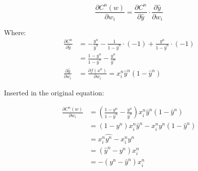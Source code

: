 
\begin{equation*}
    \frac{\partial C^n(w)}{\partial w_i} = \frac{\partial C^n}{\partial \hat{y}} \cdot \frac{\partial \hat{y}}{\partial w_i}
\end{equation*}

Where:
\begin{align*}
    \frac{\partial C^n}{\partial \hat{y}} &= - \frac{y^n}{\hat{y}^n} - \frac{1}{1 - \hat{y}^n} \cdot (-1) + \frac{y^n}{1-\hat{y}^n} \cdot (-1) \\
    &= \frac{1 - y^n}{1 - \hat{y}^n} - \frac{y^n}{\hat{y}^n} \\
    \frac{\partial \hat{y}}{\partial w_i} &= \frac{\partial f(x^n)}{\partial w_i} = x_i^n\hat{y}^n(1-\hat{y}^n)
\end{align*}

Inserted in the original equation:

\begin{align*}
    \frac{\partial C^n(w)}{\partial w_i} &= \left( \frac{1 - y^n}{1 - \hat{y}^n} - \frac{y^n}{\hat{y}^n} \right)x_i^n\hat{y}^n(1-\hat{y}^n) \\
    &= (1-y^n)x_i^n\hat{y}^n - x_i^ny^n(1-\hat{y}^n) \\
    &= x_i^n\hat{y^n} - x_i^ny^n \\
    &= (\hat{y}^n - y^n)x_i^n \\
    &= -(y^n - \hat{y}^n)x_i^n
\end{align*}